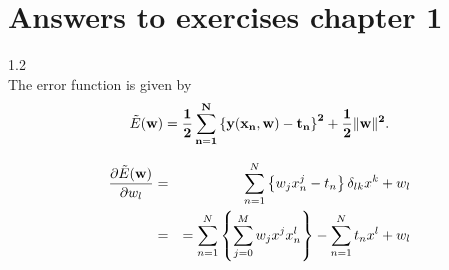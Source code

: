 \section{Answers to exercises chapter 1}
1.2 \\
The error function is given by
\begin{eqnarray}
 \tilde{E}(\bf{w}) = \frac{1}{2} \sum_{n=1}^N
  \left \{
   y(x_n, \bf{w}) - t_n
  \right \}^2 + \frac{1}{2} \| \bf{w} \|^2 .
\end{eqnarray}

\begin{eqnarray}
 \frac{\partial \tilde{E}(\bf{w})}{\partial w_l}
 &=&
  \sum_{n=1}^{N}
  \left \{
   w_j x_n^j - t_n
   \right \} \delta_{lk} x^k + w_l \\
 &=&
  = \sum_{n=1}^N
  \left \{
   \sum_{j=0}^M w_j x^j x_n^l
          \right \}
          - \sum_{n=1}^N t_n x^l + w_l
\end{eqnarray}

